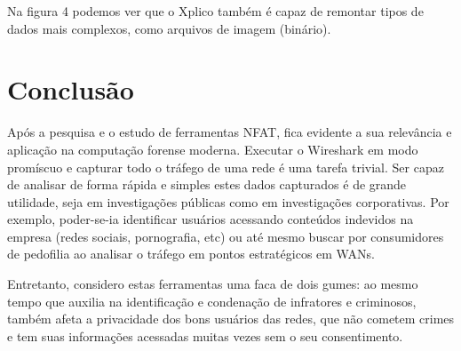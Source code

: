 \documentclass[12pt]{article}
\begin{document}
Na figura 4 podemos ver que o Xplico também é capaz de remontar tipos de dados mais complexos, como arquivos de imagem (binário).

\section{Conclusão}

Após a pesquisa e o estudo de ferramentas NFAT, fica evidente a sua relevância e aplicação na computação forense moderna. Executar o Wireshark em modo promíscuo e capturar todo o tráfego de uma rede é uma tarefa trivial. Ser capaz de analisar de forma rápida e simples estes dados capturados é de grande utilidade, seja em investigações públicas como em investigações corporativas. Por exemplo, poder-se-ia identificar usuários acessando conteúdos indevidos na empresa (redes sociais, pornografia, etc) ou até mesmo buscar por consumidores de pedofilia ao analisar o tráfego em pontos estratégicos em WANs.

Entretanto, considero estas ferramentas uma faca de dois gumes: ao mesmo tempo que auxilia na identificação e condenação de infratores e criminosos, também afeta a privacidade dos bons usuários das redes, que não cometem crimes e tem suas informações acessadas muitas vezes sem o seu consentimento.



\end{document}
